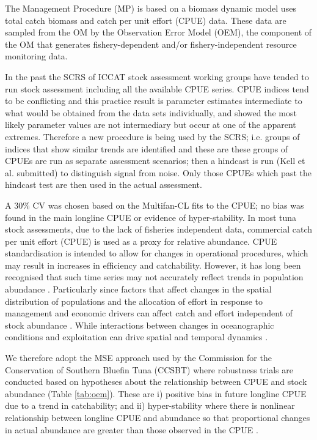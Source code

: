 \documentclass[%
nonumbib,      %
%
]{nrc1}                          %
\begin{document}

The Management Procedure (MP) is based on a biomass dynamic model uses total catch biomass and catch per unit effort (CPUE) data. These data are sampled from the OM by the Observation Error Model (OEM),  the component of the OM that generates fishery-dependent and/or fishery-independent resource monitoring data.

In the past the SCRS of ICCAT stock assessment working groups have tended to run stock assessment including all the available CPUE series. CPUE indices tend to be conflicting and this practice result is parameter estimates intermediate to what would be obtained from the data sets individually, and \cite{schnute1993analysis} showed the most likely parameter values are not intermediary but occur at one of the apparent extremes. Therefore a new procedure is being used by the SCRS; i.e. groups of indices that show similar trends are identified and these are these groups of CPUEs are run as separate assessment scenarios; then a hindcast is run (Kell et al. submitted) to distinguish signal from noise. Only those CPUEs which past the hindcast test are then used in the actual assessment. 

A 30\% CV was chosen based on the Multifan-CL fits to the CPUE; no bias was found in the main longline CPUE or evidence of hyper-stability.  In most tuna stock assessments, due to the lack of fisheries independent data, commercial catch per unit effort (CPUE) is used as a proxy for relative abundance. CPUE standardisation is intended to allow for changes in operational procedures, which may result in increases in efficiency and catchability.  However, it has long been recognised that such time series may not accurately reflect trends in population abundance \citep[e.g.][]{beverton1993dynamics, harley2001cpue, maunder_interpreting_2006, mckechnie_longline_2013,polacheck2006tuna}. Particularly since factors that affect changes in the spatial distribution of populations and the allocation of effort in response to management and economic drivers can affect catch and effort independent of  stock abundance \citep[e.g.][]{paloheimo_abundance_1964, tidd2011exit}. While interactions between changes in oceanographic conditions and exploitation can drive spatial and temporal dynamics \citep[see][]{fromentin2013oceanographic,arrizabalaga2014habitat}. 
     
We therefore adopt the MSE approach used by the Commission for the Conservation of Southern Bluefin Tuna (CCSBT) where robustness trials are conducted \citep{hillary2015scientific} based on hypotheses about the relationship between CPUE and stock abundance (Table \ref{tab:oem}). These are  i) positive bias in future longline CPUE due to a trend in catchability; and ii)  hyper-stability where there is nonlinear relationship between longline CPUE and abundance so that proportional changes in actual abundance are greater than those observed in the CPUE \citep{harley2001cpue}.
\end{document}
